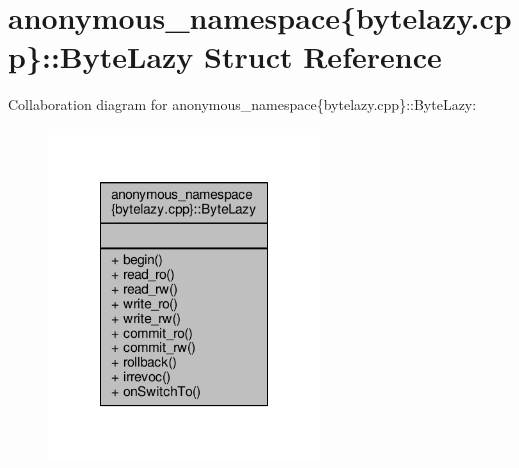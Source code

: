 \hypertarget{structanonymous__namespace_02bytelazy_8cpp_03_1_1ByteLazy}{\section{anonymous\-\_\-namespace\{bytelazy.\-cpp\}\-:\-:Byte\-Lazy Struct Reference}
\label{structanonymous__namespace_02bytelazy_8cpp_03_1_1ByteLazy}
}


Collaboration diagram for anonymous\-\_\-namespace\{bytelazy.\-cpp\}\-:\-:Byte\-Lazy\-:
\nopagebreak
\begin{figure}[H]
\begin{center}
\leavevmode
\includegraphics[width=204pt]{structanonymous__namespace_02bytelazy_8cpp_03_1_1ByteLazy__coll__graph}
\end{center}
\end{figure}

